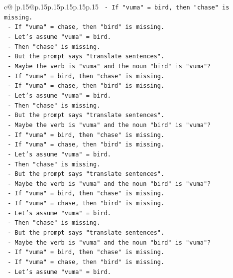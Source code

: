 \documentclass{article}
\begin{document}
{\begin{supertabular}{c@{$\;$}|p{.15\linewidth}@{}p{.15\linewidth}p{.15\linewidth}p{.15\linewidth}p{.15\linewidth}p{.15\linewidth}}
{{{\texttt{    {-} If "vuma" = bird, then "chase" is missing.} \\
\texttt{    {-} If "vuma" = chase, then "bird" is missing.} \\
\texttt{    {-} Let's assume "vuma" = bird.} \\
\texttt{    {-} Then "chase" is missing.} \\
\texttt{    {-} But the prompt says "translate sentences".} \\
\texttt{    {-} Maybe the verb is "vuma" and the noun "bird" is "vuma"?} \\
\texttt{    {-} If "vuma" = bird, then "chase" is missing.} \\
\texttt{    {-} If "vuma" = chase, then "bird" is missing.} \\
\texttt{    {-} Let's assume "vuma" = bird.} \\
\texttt{    {-} Then "chase" is missing.} \\
\texttt{    {-} But the prompt says "translate sentences".} \\
\texttt{    {-} Maybe the verb is "vuma" and the noun "bird" is "vuma"?} \\
\texttt{    {-} If "vuma" = bird, then "chase" is missing.} \\
\texttt{    {-} If "vuma" = chase, then "bird" is missing.} \\
\texttt{    {-} Let's assume "vuma" = bird.} \\
\texttt{    {-} Then "chase" is missing.} \\
\texttt{    {-} But the prompt says "translate sentences".} \\
\texttt{    {-} Maybe the verb is "vuma" and the noun "bird" is "vuma"?} \\
\texttt{    {-} If "vuma" = bird, then "chase" is missing.} \\
\texttt{    {-} If "vuma" = chase, then "bird" is missing.} \\
\texttt{    {-} Let's assume "vuma" = bird.} \\
\texttt{    {-} Then "chase" is missing.} \\
\texttt{    {-} But the prompt says "translate sentences".} \\
\texttt{    {-} Maybe the verb is "vuma" and the noun "bird" is "vuma"?} \\
\texttt{    {-} If "vuma" = bird, then "chase" is missing.} \\
\texttt{    {-} If "vuma" = chase, then "bird" is missing.} \\
\texttt{    {-} Let's assume "vuma" = bird.} \\
}}}
\end{supertabular}}
\end{document}

